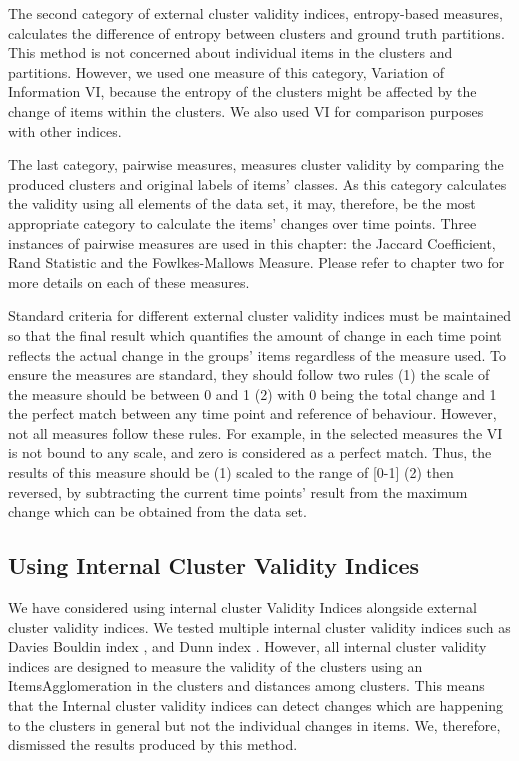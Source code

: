 The second category of external cluster validity indices, entropy-based measures, calculates the difference of entropy between clusters and ground truth partitions. This method is not concerned about individual items in the clusters and partitions. However, we used one measure of this category, Variation of Information VI, because the entropy of the clusters might be affected by the change of items within the clusters. We also used VI for comparison purposes with other indices.
         
The last category, pairwise measures, measures cluster validity by comparing the produced clusters and original labels of items' classes. As this category calculates the validity using all elements of the data set,  it may, therefore, be the most appropriate category to calculate the items' changes over time points. Three instances of pairwise measures are used in this chapter: the Jaccard Coefficient, Rand Statistic and the Fowlkes-Mallows Measure. Please refer to chapter two for more details on each of these measures.
         
Standard criteria for different external cluster validity indices must be maintained so that the final result which quantifies the amount of change in each time point reflects the actual change in the groups' items regardless of the measure used. To ensure the measures are standard, they should follow two rules (1) the scale of the measure should be between 0 and 1 (2) with 0 being the total change and 1 the perfect match between any time point and reference of behaviour. However, not all measures follow these rules. For example, in the selected measures the VI is not bound to any scale, and zero is considered as a perfect match. Thus, the results of this measure should be (1) scaled to the range of  [0-1] (2) then reversed, by subtracting the current time points' result from the maximum change which can be obtained from the data set.
         
\subsection{Using Internal Cluster Validity Indices}
         
We have considered using internal cluster Validity Indices alongside external cluster validity indices.  We tested multiple internal cluster validity indices such as Davies Bouldin index \cite{Davies1979a}, and Dunn index \cite{Dunn1973a}. However, all internal cluster validity indices are designed to measure the validity of the clusters using an \gls{ItemsAgglomeration} in the clusters and distances among clusters. This means that the Internal cluster validity indices can detect changes which are happening to the clusters in general but not the individual changes in items. We, therefore, dismissed the results produced by this method.
         
